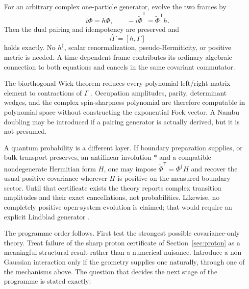 \documentclass[11pt,letterpaper]{article}
\begin{document}
For an arbitrary complex one-particle generator, evolve the two frames by
\begin{equation*}
  i\dot\Phi=h\Phi,\qquad
  -i\dot{\widetilde\Phi}^{\mathsf T}
     =\widetilde\Phi^{\mathsf T}h .
\end{equation*}
Then the dual pairing and idempotency are preserved and
\begin{equation*}
  \boxed{\,i\dot\Gamma=[h,\Gamma]\,}
\end{equation*}
holds exactly. No $h^\dagger$, scalar renormalization, pseudo-Hermiticity, or
positive metric is needed. A time-dependent frame contributes its ordinary
algebraic connection to both equations and cancels in the same covariant
commutator.

The biorthogonal Wick theorem reduces every polynomial left/right matrix
element to contractions of $\Gamma$ \cite{burton2021}. Occupation amplitudes,
parity, determinant wedges, and the complex spin-sharpness polynomial are
therefore computable in polynomial space without constructing the exponential
Fock vector. A Nambu doubling may be introduced if a pairing generator is
actually derived, but it is not presumed.

A quantum probability is a different layer. If boundary preparation supplies,
or bulk transport preserves, an antilinear involution $*$ and a compatible
nondegenerate Hermitian form $H$, one may impose
$\widetilde\Phi^{\mathsf T}=\Phi^\dagger H$ and recover the usual positive
covariance wherever $H$ is positive on the measured boundary sector. Until
that certificate exists the theory reports complex transition amplitudes and
their exact cancellations, not probabilities. Likewise, no completely
positive open-system evolution is claimed; that would require an explicit
Lindblad generator \cite{lindblad1976}.

The programme order follows. First test the strongest possible covariance-only
theory. Treat failure of the sharp proton certificate of
Section~\ref{sec:proton} as a meaningful structural result rather than a
numerical nuisance. Introduce a non-Gaussian interaction only if the geometry
supplies one naturally, through one of the mechanisms above. The question that
decides the next stage of the programme is stated exactly:

\begin{center}
\end{center}
\end{document}
